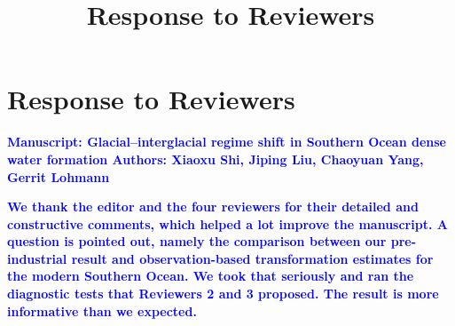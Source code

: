 \documentclass[pdflatex,sn-nature]{sn-jnl}
\begin{document}
\title[Response to Reviewers]{Response to Reviewers}

\author*[1]{ }
\author*[2,1]{ }
\author[1]{ }
\author[3]{ }


\maketitle

\clearpage
\section*{Response to Reviewers}

\noindent\textcolor{blue}{\textbf{\textbf{Manuscript:} Glacial--interglacial regime shift in Southern Ocean dense water formation \textbf{Authors:} Xiaoxu Shi, Jiping Liu, Chaoyuan Yang, Gerrit Lohmann}}




\noindent\textcolor{blue}{\textbf{We thank the editor and the four reviewers for their detailed and constructive comments, which helped a lot improve the manuscript. A question is pointed out, namely the comparison between our pre-industrial result and observation-based transformation estimates for the modern Southern Ocean. We took that seriously and ran the diagnostic tests that Reviewers 2 and 3 proposed. The result is more informative than we expected.}}
\end{document}
